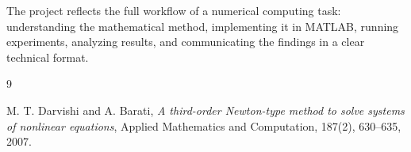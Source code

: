 \documentclass[11pt]{article}
\begin{document}
The project reflects the full workflow of a numerical computing task: understanding the mathematical method, implementing it in MATLAB, running experiments, analyzing results, and communicating the findings in a clear technical format.

\begin{thebibliography}{9}

M. T. Darvishi and A. Barati,
\textit{A third-order Newton-type method to solve systems of nonlinear equations},
Applied Mathematics and Computation, 187(2), 630--635, 2007.

\end{thebibliography}
\end{document}
